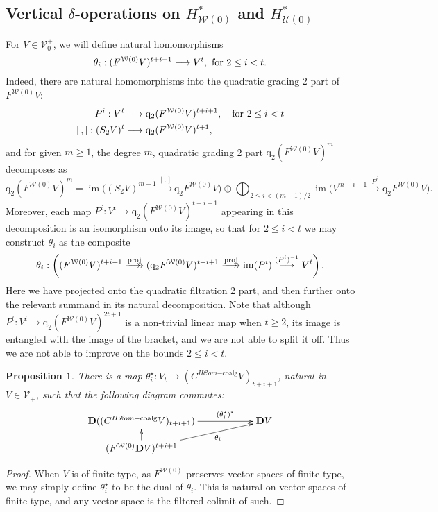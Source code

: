 \documentclass[11pt]{amsart} \renewcommand{\baselinestretch}{1.4}
\theoremstyle{plain}
\newtheorem{prop}[thm]{Proposition}
\theoremstyle{definition}
\DeclareMathOperator{\im}{im}
\renewcommand{\to}{\longrightarrow}
\newcommand{\scrC}{\mathscr{C}}
\newcommand{\calU}{\mathcal{U}}
\newcommand{\calV}{\mathcal{V}}
\newcommand{\calw}{\mathcal{W}}
\newcommand{\vect}[2]{\calV^{#1}_{#2}}
\newcommand{\HC}[1]{H#1\mathrm{-coalg}}
\newcommand{\quadgrad}[1]{\mathrm{q}_{#1}}
\newcommand{\ExtCohOp}{\mathrm{Sq}_\mathrm{ext}}
\newcommand{\algs}{{\scrC\!\textit{om}}}
\newcommand{\dual}{\mathbf{D}}
\begin{document}
\begin{Cohomology Operations for W and U}
\subsection{Vertical $\delta$-operations on $H^*_{\calw(0)}$ and $H^*_{\calU(0)}$}
For $V\in \vect{+}{0}$, we will define natural homomorphisms
\[\theta_i:(F^{\calw(0)}V)^{t+i+1}\to V^{t}, \textup{ for $2\leq i<t$}.\]
Indeed, there are natural homomorphisms into the quadratic grading 2 part of $F^{\calw(0)}V$:
\begin{align*}
P^i:V^{t}&\to \quadgrad{2}(F^{\calw(0)}V)^{t+i+1}, \textup{\quad  for $2\leq i<t$}\\
[\,,]:(S_2V)^{t}&\to \quadgrad{2}(F^{\calw(0)}V)^{t+1},
\end{align*}
and for given $m\geq1$, the degree $m$, quadratic grading 2 part $\quadgrad{2}(F^{\calw(0)}V)^m$ decomposes as
%
\[\quadgrad{2}(F^{\calw(0)}V)^{m}=%
\im \bigl((S_2V)^{m-1}\overset{[,]}{\to} \quadgrad{2}F^{\calw(0)}V\bigr)%
\oplus\bigoplus_{\!\!\!\!\!\!2\leq i< (m-1)/2\!\!\!\!\!\!}\im \bigl(V^{m-i-1}\overset{P^i}{\to}\quadgrad{2}F^{\calw(0)}V\bigr).\]
Moreover, each map $P^i:V^t\to \quadgrad{2}(F^{\calw(0)}V)^{t+i+1}$ appearing in this decomposition is an isomorphism onto its image, so that for $2\leq i <t$ we may construct $\theta_i$ as the composite
\[\theta_i:\left((F^{\calw(0)}V)^{t+i+1}\overset{\textup{proj}}{\makebox[.06ex][l]{$\to$}\to} (\quadgrad{2}F^{\calw(0)}V)^{t+i+1}\overset{\textup{proj}}{\makebox[.06ex][l]{$\to$}\to} \im (P^i)\overset{(P^i)^{-1}}{\to}V^{t}\right).\]
Here we have projected onto the quadratic filtration 2 part, and then further onto the relevant summand in its natural decomposition. Note that although $P^t:V^t\to \quadgrad{2}(F^{\calw(0)}V)^{2t+1}$ is a non-trivial linear map when $t\geq2$, its image is entangled with the image of the bracket, and we are not able to split it off. Thus we are not able to improve on the bounds $2\leq i< t$.
\begin{prop}
There is a map $\theta_i^\star:V_t\to (C^{\HC{\algs}}V)_{t+i+1}$, natural in $V\in\vect{}{+}$, such that the following diagram commutes:
\[\xymatrix@R=4mm@C=20mm{
\dual((C^{\HC{\algs}}V)_{t+i+1})&%
\dual V\ar[l];[]^-{(\theta_i^\star)^*}
\\%
(F^{\calw(0)}\dual V)^{t+i+1}\ar[u]\ar[ur]_-{\theta_i}
}\]
\end{prop}
\begin{proof}
When $V$ is of finite type, as $F^{\calw(0)}$ preserves vector spaces of finite type, we may simply define $\theta_i^\star$ to be the dual of $\theta_i$. This is natural on vector spaces of finite type, and any vector space is the filtered colimit of such.
\end{proof}



\end{Cohomology Operations for W and U}
\end{document}
